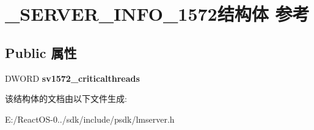 \hypertarget{struct___s_e_r_v_e_r___i_n_f_o__1572}{}\section{\+\_\+\+S\+E\+R\+V\+E\+R\+\_\+\+I\+N\+F\+O\+\_\+1572结构体 参考}
\label{struct___s_e_r_v_e_r___i_n_f_o__1572}
\subsection*{Public 属性}
\begin{DoxyCompactItemize}
\item 
\mbox{\label{struct___s_e_r_v_e_r___i_n_f_o__1572_a74ed72e2207c6348a00c02076c15f255}} 
D\+W\+O\+RD {\bfseries sv1572\+\_\+criticalthreads}
\end{DoxyCompactItemize}


该结构体的文档由以下文件生成\+:\begin{DoxyCompactItemize}
\item 
E\+:/\+React\+O\+S-\/0../sdk/include/psdk/lmserver.\+h\end{DoxyCompactItemize}
